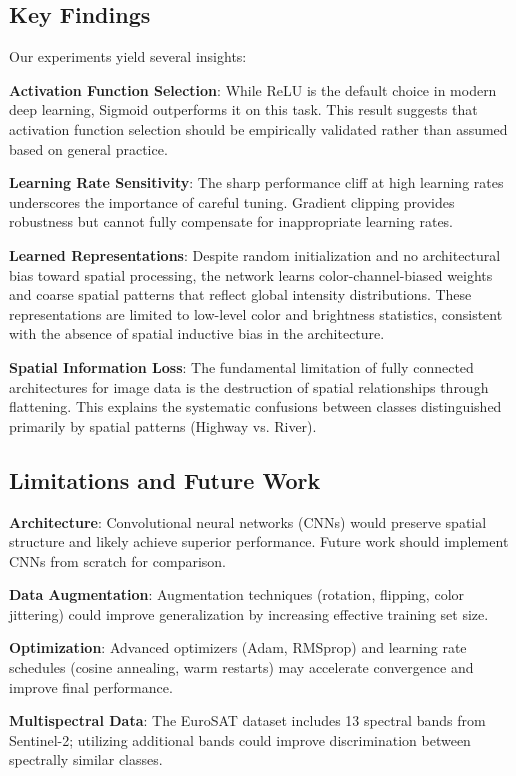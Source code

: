 \documentclass[sigconf,nonacm]{acmart}
\begin{document}
\subsection{Key Findings}

Our experiments yield several insights:

\textbf{Activation Function Selection}: While ReLU is the default choice in modern deep learning, Sigmoid outperforms it on this task. This result suggests that activation function selection should be empirically validated rather than assumed based on general practice.

\textbf{Learning Rate Sensitivity}: The sharp performance cliff at high learning rates underscores the importance of careful tuning. Gradient clipping provides robustness but cannot fully compensate for inappropriate learning rates.

\textbf{Learned Representations}: Despite random initialization and no architectural bias toward spatial processing, the network learns color-channel-biased weights and coarse spatial patterns that reflect global intensity distributions. These representations are limited to low-level color and brightness statistics, consistent with the absence of spatial inductive bias in the architecture.

\textbf{Spatial Information Loss}: The fundamental limitation of fully connected architectures for image data is the destruction of spatial relationships through flattening. This explains the systematic confusions between classes distinguished primarily by spatial patterns (Highway vs. River).

\subsection{Limitations and Future Work}

\textbf{Architecture}: Convolutional neural networks (CNNs) would preserve spatial structure and likely achieve superior performance. Future work should implement CNNs from scratch for comparison.

\textbf{Data Augmentation}: Augmentation techniques (rotation, flipping, color jittering) could improve generalization by increasing effective training set size.

\textbf{Optimization}: Advanced optimizers (Adam, RMSprop) and learning rate schedules (cosine annealing, warm restarts) may accelerate convergence and improve final performance.

\textbf{Multispectral Data}: The EuroSAT dataset includes 13 spectral bands from Sentinel-2; utilizing additional bands could improve discrimination between spectrally similar classes.
\end{document}
